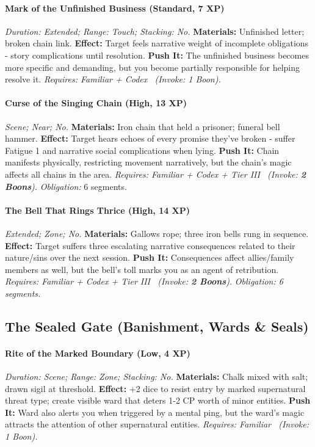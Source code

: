 \paragraph{Mark of the Unfinished Business (Standard, 7 XP)} \emph{Duration: Extended; Range: Touch; Stacking: No.}
\textbf{Materials:} Unfinished letter; broken chain link.
\textbf{Effect:} Target feels narrative weight of incomplete obligations - story complications until resolution.
\textbf{Push It:} The unfinished business becomes more specific and demanding, but you become partially responsible for helping resolve it.
\emph{Requires: Familiar + Codex \ (\textit{Invoke:} 1 Boon).}
\paragraph{Curse of the Singing Chain (High, 13 XP)} \emph{Scene; Near; No.}
\textbf{Materials:} Iron chain that held a prisoner; funeral bell hammer.
\textbf{Effect:} Target hears echoes of every promise they've broken - suffer Fatigue 1 and narrative social complications when lying.
\textbf{Push It:} Chain manifests physically, restricting movement narratively, but the chain's magic affects all chains in the area.
\emph{Requires: Familiar + Codex + Tier III \ (\textit{Invoke:} \textbf{2 Boons}).}
\emph{Obligation:} 6 segments.

\paragraph{The Bell That Rings Thrice (High, 14 XP)} \emph{Extended; Zone; No.}
\textbf{Materials:} Gallows rope; three iron bells rung in sequence.
\textbf{Effect:} Target suffers three escalating narrative consequences related to their nature/sins over the next session.
\textbf{Push It:} Consequences affect allies/family members as well, but the bell's toll marks you as an agent of retribution.
\emph{Requires: Familiar + Codex + Tier III \ (\textit{Invoke:} \textbf{2 Boons}).}
\emph{Obligation: 6 segments.}

\subsection{The Sealed Gate (Banishment, Wards \& Seals)}
\paragraph{Rite of the Marked Boundary (Low, 4 XP)} \emph{Duration: Scene; Range: Zone; Stacking: No.}
\textbf{Materials:} Chalk mixed with salt; drawn sigil at threshold.
\textbf{Effect:} +2 dice to resist entry by marked supernatural threat type; create visible ward that deters 1-2 CP worth of minor entities.
\textbf{Push It:} Ward also alerts you when triggered by a mental ping, but the ward's magic attracts the attention of other supernatural entities.
\emph{Requires: Familiar \ (\textit{Invoke:} 1 Boon).}
